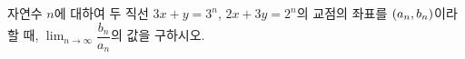 자연수 $n$에 대하여 두 직선 $3x+y=3^n$, $2x+3y=2^n$의 교점의 좌표를 $(a_n{,}\mkern3mu\mathopen{}b_n)$이라 할 때, $\displaystyle\lim_{n\to\infty}\dfrac{b_n}{a_n}$의 값을 구하시오.
